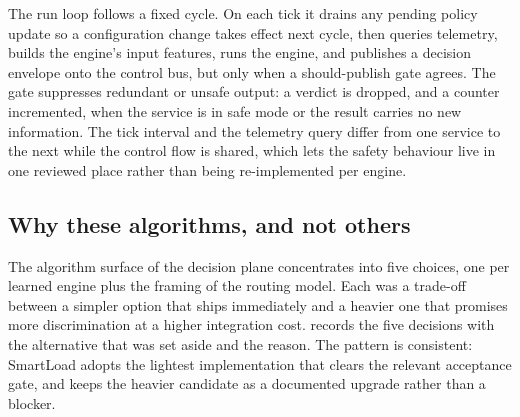 The run loop follows a fixed cycle. On each tick it drains any pending policy
update so a configuration change takes effect next cycle, then queries telemetry,
builds the engine's input features, runs the engine, and publishes a decision
envelope onto the control bus, but only when a should-publish gate agrees. The
gate suppresses redundant or unsafe output: a verdict is dropped, and a counter
incremented, when the service is in safe mode or the result carries no new
information. The tick interval and the telemetry query differ from one service to
the next while the control flow is shared, which lets the safety behaviour live in
one reviewed place rather than being re-implemented per engine.

\subsection{Why these algorithms, and not others}\label{imb:algo_choices}

The algorithm surface of the decision plane concentrates into five choices, one
per learned engine plus the framing of the routing model. Each was a trade-off
between a simpler option that ships immediately and a heavier one that promises
more discrimination at a higher integration cost.
 records the five decisions with the alternative that
was set aside and the reason. The pattern is consistent: SmartLoad adopts the
lightest implementation that clears the relevant acceptance gate, and keeps the
heavier candidate as a documented upgrade rather than a blocker.

